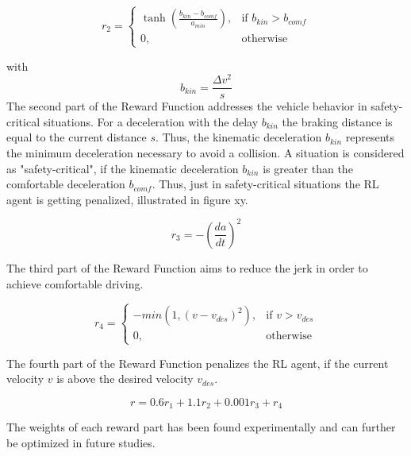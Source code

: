 \documentclass[review]{elsarticle}
\begin{document}
\begin{equation}
r_2 = 
\begin{cases}
\tanh\left(\frac{b_{kin}-b_{comf}}{a_{min}}\right),& \text{if } b_{kin}>b_{comf}\\
0,              & \text{otherwise}
\end{cases}
\end{equation}

with
\begin{equation}
b_{kin} = \frac{\Delta v^2}{s}
\end{equation}
The second part of the Reward Function addresses the vehicle behavior in safety-critical situations.
For a deceleration with the delay $b_{kin}$ the braking distance is equal to the current distance $s$. Thus, the kinematic deceleration $b_{kin}$ represents the minimum deceleration necessary to avoid a collision. A situation is considered as "safety-critical", if the kinematic deceleration $b_{kin}$ is greater than the comfortable deceleration $b_{comf}$. Thus, just in safety-critical situations the RL agent is getting penalized, illustrated in figure xy.

\begin{equation}
r_3 = -\left(\dfrac{da}{dt}\right)^2
\end{equation}

The third part of the Reward Function aims to reduce the jerk in order to achieve comfortable driving. 

\begin{equation}
r_4 =  
\begin{cases} 
 -min\left(1,\left( v - v_{des}\right)^2\right), & \text{if } v>v_{des}\\
0, & \text{otherwise}
\end{cases}             
\end{equation}

The fourth part of the Reward Function penalizes the RL agent, if the current velocity $v$ is above the desired velocity $v_{des}$. 

\begin{equation}
r = 0.6r_1 + 1.1r_2 + 0.001 r_3 + r_4
\end{equation}

The weights of each reward part has been found experimentally and can further be optimized in future studies.
\end{document}

